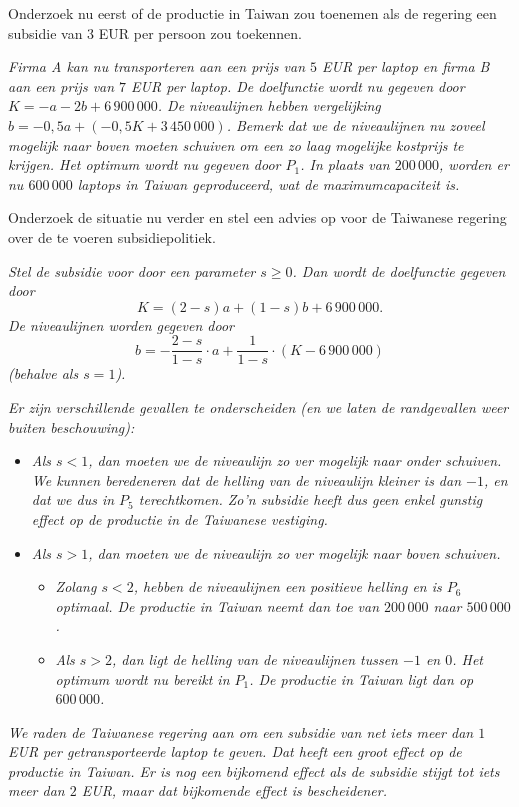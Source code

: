     
    \begin{werktekstoef}
    \setcounter{enumi}{1}                       %
    \item Onderzoek nu eerst of de productie in Taiwan zou toenemen als de regering een subsidie van $3$ EUR per persoon zou toekennen.
    
    \emph{Firma A kan nu transporteren aan een prijs van $5$ EUR per laptop en firma B aan een prijs van $7$ EUR per laptop. De doelfunctie wordt nu gegeven door $K=-a-2b+6\,900\,000$. De niveaulijnen hebben vergelijking $b=-0,5a+(-0,5K+3\,450\,000)$. Bemerk dat we de niveaulijnen nu zoveel mogelijk naar boven moeten schuiven om een zo laag mogelijke kostprijs te krijgen. Het optimum wordt nu gegeven door $P_1$. In plaats van $200\,000$, worden er nu $600\,000$ laptops in Taiwan geproduceerd, wat de maximumcapaciteit is.}
    
    \item Onderzoek de situatie nu verder en stel een advies op voor de Taiwanese regering over de te voeren subsidiepolitiek.
    
    \emph{Stel de subsidie voor door een parameter $s \ge 0$. Dan wordt de doelfunctie gegeven door}
    $$K=(2-s)a+(1-s)b+6\,900\,000.$$ 
    \emph{De niveaulijnen worden gegeven door}
        $$b=-\frac{2-s}{1-s} \cdot a + \frac{1}{1-s} \cdot (K-6\,900\,000)$$ 
    \emph{(behalve als $s=1$).}
    
    \emph{Er zijn verschillende gevallen te onderscheiden (en we laten de randgevallen weer buiten beschouwing):}
         \begin{itemize}
        \item \emph{Als $s<1$, dan moeten we de niveaulijn zo ver mogelijk naar onder schuiven. We kunnen beredeneren dat de helling van de niveaulijn kleiner is dan $-1$, en dat we dus in $P_5$ terechtkomen. Zo’n subsidie heeft dus geen enkel gunstig effect op de productie in de Taiwanese vestiging.}
        \item \emph{Als $s>1$, dan moeten we de niveaulijn zo ver mogelijk naar boven schuiven.}
        
        \begin{itemize}
            \item \emph{Zolang $s<2$, hebben de niveaulijnen een positieve helling en is $P_6$ optimaal. De productie in Taiwan neemt dan toe van $200\,000$ naar $500\,000$.}
            \item \emph{Als $s>2$, dan ligt de helling van de niveaulijnen tussen $-1$ en $0$. Het optimum wordt nu bereikt in $P_1$. De productie in Taiwan ligt dan op $600\,000$.}
        \end{itemize}
    \end{itemize}
    \emph{We raden de Taiwanese regering aan om een subsidie van net iets meer dan $1$ EUR per getransporteerde laptop te geven. Dat heeft een groot effect op de productie in Taiwan. Er is nog een bijkomend effect als de subsidie stijgt tot iets meer dan $2$ EUR, maar dat bijkomende effect is bescheidener.}    
    \end{werktekstoef}
    

